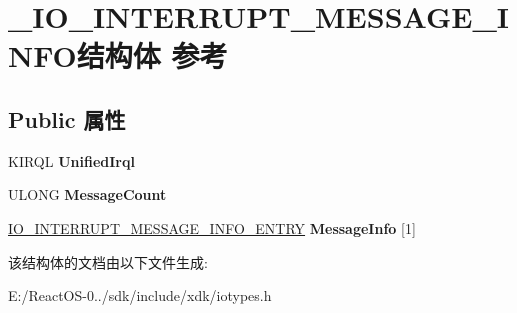 \hypertarget{struct___i_o___i_n_t_e_r_r_u_p_t___m_e_s_s_a_g_e___i_n_f_o}{}\section{\+\_\+\+I\+O\+\_\+\+I\+N\+T\+E\+R\+R\+U\+P\+T\+\_\+\+M\+E\+S\+S\+A\+G\+E\+\_\+\+I\+N\+F\+O结构体 参考}
\label{struct___i_o___i_n_t_e_r_r_u_p_t___m_e_s_s_a_g_e___i_n_f_o}
\subsection*{Public 属性}
\begin{DoxyCompactItemize}
\item 
\mbox{\label{struct___i_o___i_n_t_e_r_r_u_p_t___m_e_s_s_a_g_e___i_n_f_o_aa238a60a40bf9913538755254eba0e02}} 
K\+I\+R\+QL {\bfseries Unified\+Irql}
\item 
\mbox{\label{struct___i_o___i_n_t_e_r_r_u_p_t___m_e_s_s_a_g_e___i_n_f_o_a80c92aa13a4273c7ba2ecf6edc9c8c5d}} 
U\+L\+O\+NG {\bfseries Message\+Count}
\item 
\mbox{\label{struct___i_o___i_n_t_e_r_r_u_p_t___m_e_s_s_a_g_e___i_n_f_o_aef032ce06a35e5e6a958d5496b4a3e93}} 
\hyperlink{struct___i_o___i_n_t_e_r_r_u_p_t___m_e_s_s_a_g_e___i_n_f_o___e_n_t_r_y}{I\+O\+\_\+\+I\+N\+T\+E\+R\+R\+U\+P\+T\+\_\+\+M\+E\+S\+S\+A\+G\+E\+\_\+\+I\+N\+F\+O\+\_\+\+E\+N\+T\+RY} {\bfseries Message\+Info} \mbox{[}1\mbox{]}
\end{DoxyCompactItemize}


该结构体的文档由以下文件生成\+:\begin{DoxyCompactItemize}
\item 
E\+:/\+React\+O\+S-\/0../sdk/include/xdk/iotypes.\+h\end{DoxyCompactItemize}
